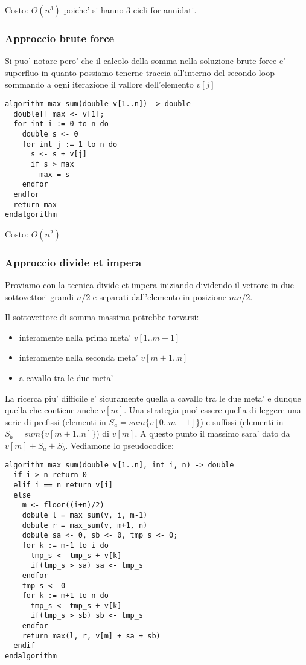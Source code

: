 \documentclass{article}
\begin{document}
Costo: $O(n^3)$ poiche' si hanno 3 cicli for annidati.

\subsubsection{Approccio brute force}

Si puo' notare pero' che il calcolo della somma nella soluzione brute force e'
superfluo in quanto possiamo tenerne traccia all'interno del secondo loop sommando
a ogni iterazione il vallore dell'elemento $v[j]$

\begin{lstlisting}
algorithm max_sum(double v[1..n]) -> double
  double[] max <- v[1];
  for int i := 0 to n do
    double s <- 0
    for int j := 1 to n do
      s <- s + v[j]
      if s > max
        max = s
    endfor
  endfor
  return max
endalgorithm
\end{lstlisting}

Costo: $O(n^2)$

\subsubsection{Approccio divide et impera}

Proviamo con la tecnica divide et impera iniziando dividendo il vettore in due
sottovettori grandi $n/2$ e separati dall'elemento in posizione $m n/2$.

Il sottovettore di somma massima potrebbe torvarsi:
\begin{itemize}
  \item interamente nella prima meta' $v[1..m-1]$
  \item interamente nella seconda meta' $v[m+1..n]$
  \item a cavallo tra le due meta'
\end{itemize}

La ricerca piu' difficile e' sicuramente quella a cavallo tra le due meta' e
dunque quella che contiene anche $v[m]$. Una strategia puo' essere quella di leggere
una serie di prefissi (elementi in $S_a = sum \{v[0..m-1]\}$) e suffissi (elementi
in $S_b = sum \{v[m+1..n]\}$) di $v[m]$. A questo punto il massimo sara' dato
da $v[m] + S_a + S_b$. Vediamone lo pseudocodice:

\begin{lstlisting}
algorithm max_sum(double v[1..n], int i, n) -> double
  if i > n return 0
  elif i == n return v[i]
  else
    m <- floor((i+n)/2)
    dobule l = max_sum(v, i, m-1)
    dobule r = max_sum(v, m+1, n)
    dobule sa <- 0, sb <- 0, tmp_s <- 0;
    for k := m-1 to i do
      tmp_s <- tmp_s + v[k]
      if(tmp_s > sa) sa <- tmp_s
    endfor
    tmp_s <- 0
    for k := m+1 to n do
      tmp_s <- tmp_s + v[k]
      if(tmp_s > sb) sb <- tmp_s
    endfor
    return max(l, r, v[m] + sa + sb)
  endif
endalgorithm
\end{lstlisting}
\end{document}
